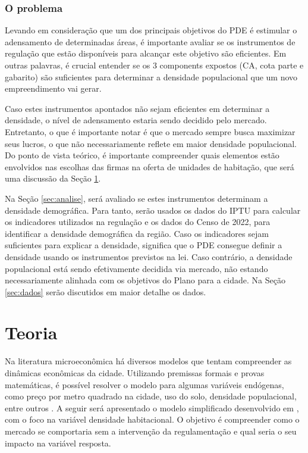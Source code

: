 \subsection*{\textbf{O problema}}

Levando em consideração que um dos principais objetivos do PDE é estimular o adensamento de determinadas áreas, é importante avaliar se os instrumentos de regulação que estão disponíveis para alcançar este objetivo são eficientes. Em outras palavras, é crucial entender se os 3 components expostos (CA, cota parte e gabarito) são suficientes para determinar a densidade populacional que um novo empreendimento vai gerar. 

Caso estes instrumentos apontados não sejam eficientes em determinar a densidade, o nível de adensamento estaria sendo decidido pelo mercado. Entretanto, o que é importante notar é que o mercado sempre busca maximizar seus lucros, o que não necessariamente reflete em maior densidade populacional. Do ponto de vista teórico, é importante compreender quais elementos estão envolvidos nas escolhas das firmas na oferta de unidades de habitação, que será uma discussão da Seção \ref{sec:micro}.

Na Seção \ref{sec:analise}, será avaliado se estes instrumentos determinam a densidade demográfica. Para tanto, serão usados os dados do IPTU para calcular os indicadores utilizados na regulação e os dados do Censo de 2022, para identificar a densidade demográfica da região. Caso os indicadores sejam suficientes para explicar a densidade, significa que o PDE consegue definir a densidade usando os instrumentos previstos na lei. Caso contrário, a densidade populacional está sendo efetivamente decidida via mercado, não estando necessariamente alinhada com os objetivos do Plano para a cidade. Na Seção \ref{sec:dados} serão discutidos em maior detalhe os dados. 

\chapter{Teoria}
\label{sec:micro}

Na literatura microeconômica há diversos modelos que tentam compreender as dinâmicas econômicas da cidade. Utilizando premissas formais e provas matemáticas, é possível resolver o modelo para algumas variáveis endógenas, como preço por metro quadrado na cidade, uso do solo, densidade populacional, entre outros \cite{papageorgiou2012essay, fujita1989urban}. A seguir será apresentado o modelo simplificado desenvolvido em \cite{brueckner2011lectures}, com o foco na variável densidade habitacional. O objetivo é compreender como o mercado se comportaria sem a intervenção da regulamentação e qual seria o seu impacto na variável resposta.

